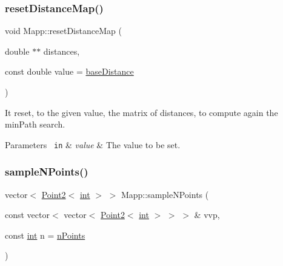 \mbox{\label{class_mapp_a6dac7b6cd03ed61e93aaa343c51862ea}} 
\subsubsection{\texorpdfstring{resetDistanceMap()}{resetDistanceMap()}}
{\footnotesize\ttfamily void Mapp\+::reset\+Distance\+Map (\begin{DoxyParamCaption}\item[{double $\ast$$\ast$}]{distances,  }\item[{const double}]{value = {\ttfamily \mbox{\hyperlink{class_mapp_ae6b2f015604d9f3e34c7702aea081e08}{base\+Distance}}} }\end{DoxyParamCaption})\hspace{0.3cm}{\ttfamily [protected]}}



It reset, to the given value, the matrix of distances, to compute again the min\+Path search. 


\begin{DoxyParams}[1]{Parameters}
\mbox{\texttt{ in}}  & {\em value} & The value to be set. \\
\hline
\end{DoxyParams}
\mbox{\label{class_mapp_a34bd022816ce083d4bb125119f47f470}} 
\subsubsection{\texorpdfstring{sampleNPoints()}{sampleNPoints()}\hspace{0.1cm}{\footnotesize\ttfamily [1/2]}}
{\footnotesize\ttfamily vector$<$ \mbox{\hyperlink{class_point2}{Point2}}$<$ \mbox{\hyperlink{draw_8hh_aa620a13339ac3a1177c86edc549fda9b}{int}} $>$ $>$ Mapp\+::sample\+N\+Points (\begin{DoxyParamCaption}\item[{const vector$<$ vector$<$ \mbox{\hyperlink{class_point2}{Point2}}$<$ \mbox{\hyperlink{draw_8hh_aa620a13339ac3a1177c86edc549fda9b}{int}} $>$ $>$ $>$ \&}]{vvp,  }\item[{const \mbox{\hyperlink{draw_8hh_aa620a13339ac3a1177c86edc549fda9b}{int}}}]{n = {\ttfamily \mbox{\hyperlink{class_mapp_addd9fcc5e7db2c40038ab32ecf29171c}{n\+Points}}} }\end{DoxyParamCaption})}



